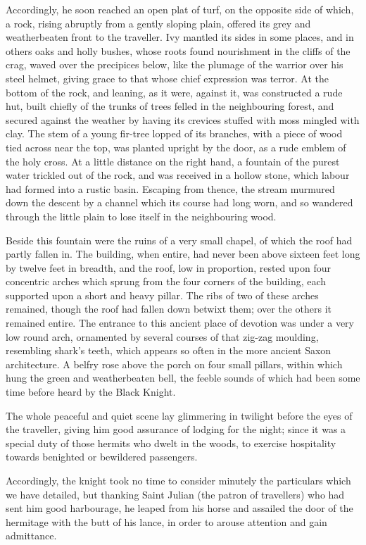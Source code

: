 Accordingly, he soon reached an open plat of turf, on the opposite side
of which, a rock, rising abruptly from a gently sloping plain, offered
its grey and weatherbeaten front to the traveller. Ivy mantled its sides
in some places, and in others oaks and holly bushes, whose roots found
nourishment in the cliffs of the crag, waved over the precipices below,
like the plumage of the warrior over his steel helmet, giving grace to
that whose chief expression was terror. At the bottom of the rock, and
leaning, as it were, against it, was constructed a rude hut, built
chiefly of the trunks of trees felled in the neighbouring forest, and
secured against the weather by having its crevices stuffed with moss
mingled with clay. The stem of a young fir-tree lopped of its branches,
with a piece of wood tied across near the top, was planted upright by
the door, as a rude emblem of the holy cross. At a little distance on
the right hand, a fountain of the purest water trickled out of the rock,
and was received in a hollow stone, which labour had formed into a
rustic basin. Escaping from thence, the stream murmured down the descent
by a channel which its course had long worn, and so wandered through the
little plain to lose itself in the neighbouring wood.

Beside this fountain were the ruins of a very small chapel, of which the
roof had partly fallen in. The building, when entire, had never been
above sixteen feet long by twelve feet in breadth, and the roof, low in
proportion, rested upon four concentric arches which sprung from the
four corners of the building, each supported upon a short and heavy
pillar. The ribs of two of these arches remained, though the roof had
fallen down betwixt them; over the others it remained entire. The
entrance to this ancient place of devotion was under a very low round
arch, ornamented by several courses of that zig-zag moulding, resembling
shark's teeth, which appears so often in the more ancient Saxon
architecture. A belfry rose above the porch on four small pillars,
within which hung the green and weatherbeaten bell, the feeble sounds of
which had been some time before heard by the Black Knight.

The whole peaceful and quiet scene lay glimmering in twilight before the
eyes of the traveller, giving him good assurance of lodging for the
night; since it was a special duty of those hermits who dwelt in the
woods, to exercise hospitality towards benighted or bewildered
passengers.

Accordingly, the knight took no time to consider minutely the
particulars which we have detailed, but thanking Saint Julian (the
patron of travellers) who had sent him good harbourage, he leaped from
his horse and assailed the door of the hermitage with the butt of his
lance, in order to arouse attention and gain admittance.

